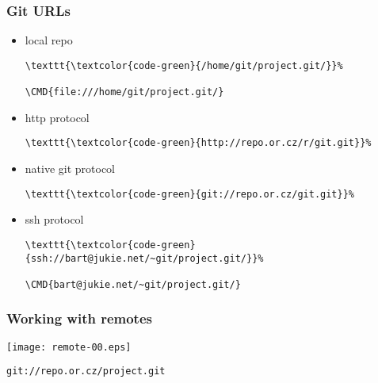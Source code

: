 \documentclass[english]{beamer}
\newcommand{\CMD}[1]{%
\texttt{\textcolor{code-green}{#1}}%
}
\begin{document}
\begin{frame}[fragile]
\frametitle{Git URLs}

\begin{itemize}
        \item local repo \\
                \begin{Verbatim}[commandchars=\\\{\}]
\CMD{/home/git/project.git/}
\CMD{file:///home/git/project.git/}
                \end{Verbatim}
                \vspace{\baselineskip}
                \pause{}

        \item http protocol \\
                \begin{Verbatim}[commandchars=\\\{\}]
\CMD{http://repo.or.cz/r/git.git}
                \end{Verbatim}
                \vspace{\baselineskip}
                \pause{}

        \item native git protocol
                \begin{Verbatim}[commandchars=\\\{\}]
\CMD{git://repo.or.cz/git.git}
                \end{Verbatim}
                \vspace{\baselineskip}
                \pause{}

        \item ssh protocol
                \begin{Verbatim}[commandchars=\\\{\}]
\CMD{ssh://bart@jukie.net/~git/project.git/}
\CMD{bart@jukie.net/~git/project.git/}
                \end{Verbatim}
\end{itemize}
\end{frame}

\begin{frame}
\frametitle{Working with remotes}

\texttt{[image: remote-00.eps]}

\begin{center}
\CMD{git://repo.or.cz/project.git}
\end{center}
\vspace{\textheight}
\end{frame}
\end{document}

